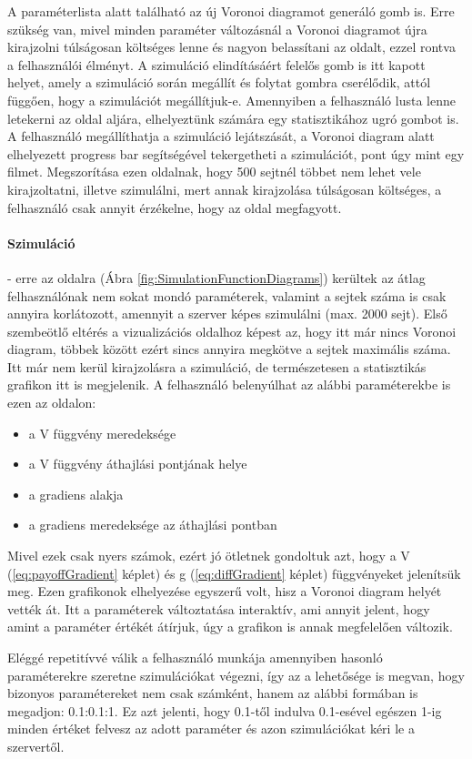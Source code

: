 A paraméterlista alatt található az új Voronoi diagramot generáló gomb is. Erre szükség van, mivel minden paraméter változásnál a Voronoi diagramot újra kirajzolni túlságosan költséges lenne és nagyon belassítani az oldalt, ezzel rontva a felhasználói élményt. A szimuláció elindításáért felelős gomb is itt kapott helyet, amely a szimuláció során megállít és folytat gombra cserélődik, attól függően, hogy a szimulációt megállítjuk-e. Amennyiben a felhasználó lusta lenne letekerni az oldal aljára, elhelyeztünk számára egy statisztikához ugró gombot is. A felhasználó megállíthatja a szimuláció lejátszását, a Voronoi diagram alatt elhelyezett progress bar segítségével tekergetheti a szimulációt, pont úgy mint egy filmet.
Megszorítása ezen oldalnak, hogy 500 sejtnél többet nem lehet vele kirajzoltatni, illetve szimulálni, mert annak kirajzolása túlságosan költséges, a felhasználó csak annyit érzékelne, hogy az oldal megfagyott.

\paragraph{Szimuláció}- erre az oldalra (Ábra \ref{fig:SimulationFunctionDiagrams}) kerültek az átlag felhasználónak nem sokat mondó paraméterek, valamint a sejtek száma is csak annyira korlátozott, amennyit a szerver képes szimulálni (max. 2000 sejt). Első szembeötlő eltérés a vizualizációs oldalhoz képest az, hogy itt már nincs Voronoi diagram, többek között ezért sincs annyira megkötve a sejtek maximális száma. Itt már nem kerül kirajzolásra a szimuláció, de természetesen a statisztikás grafikon itt is megjelenik. A felhasználó belenyúlhat az alábbi paraméterekbe is ezen az oldalon:
\begin{itemize}
	\item a V függvény meredeksége
	\item a V függvény áthajlási pontjának helye
	\item a gradiens alakja
	\item a gradiens meredeksége az áthajlási pontban
\end{itemize}
Mivel ezek csak nyers számok, ezért jó ötletnek gondoltuk azt, hogy a  V (\ref{eq:payoffGradient} képlet) és g (\ref{eq:diffGradient} képlet) függvényeket jelenítsük meg. Ezen grafikonok elhelyezése egyszerű volt, hisz a Voronoi diagram helyét vették át. Itt a paraméterek változtatása interaktív, ami annyit jelent, hogy amint a paraméter értékét átírjuk, úgy a grafikon is annak megfelelően változik.

Eléggé repetitívvé válik a felhasználó munkája amennyiben hasonló paraméterekre szeretne szimulációkat végezni, így az a lehetősége is megvan, hogy bizonyos paramétereket nem csak számként, hanem az alábbi formában is megadjon: 0.1:0.1:1. Ez azt jelenti, hogy 0.1-től indulva 0.1-esével egészen 1-ig minden értéket felvesz az adott paraméter és azon szimulációkat kéri le a szervertől.

